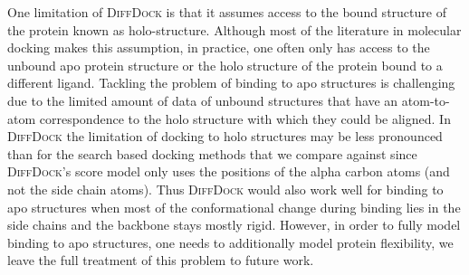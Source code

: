\documentclass{article} \usepackage{iclr2023_conference,times}
\newcommand{\new}[1]{#1}
\begin{document}
\new{One limitation of \textsc{DiffDock} is that it assumes access to the bound structure of the protein known as holo-structure. Although most of the literature in molecular docking makes this assumption, in practice, one often only has access to the unbound apo protein structure or the holo structure of the protein bound to a different ligand. Tackling the problem of binding to apo structures is challenging due to the limited amount of data of unbound structures that have an atom-to-atom correspondence to the holo structure with which they could be aligned. In \textsc{DiffDock} the limitation of docking to holo structures may be less pronounced than for the search based docking methods that we compare against since \textsc{DiffDock}'s score model only uses the positions of the alpha carbon atoms (and not the side chain atoms). Thus \textsc{DiffDock} would also work well for binding to apo structures when most of the conformational change during binding lies in the side chains and the backbone stays mostly rigid. However, in order to fully model binding to apo structures, one needs to additionally model protein flexibility, we leave the full treatment of this problem to future work. }
\end{document}
